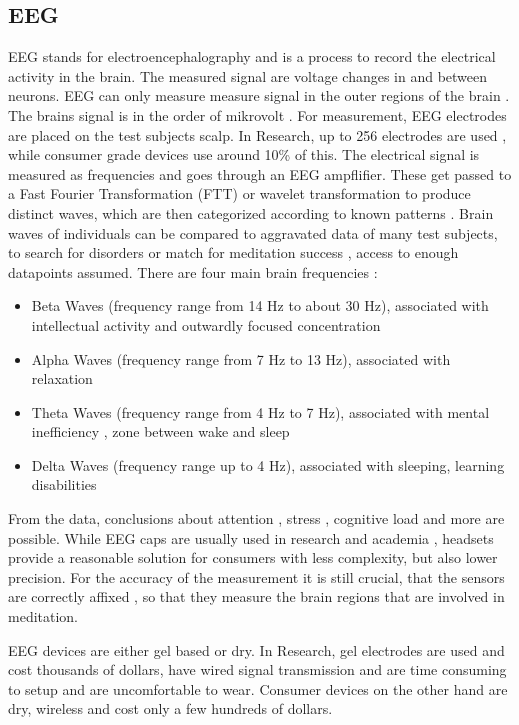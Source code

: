 \documentclass{llncs} %
\begin{document}
\subsection{EEG}
EEG stands for electroencephalography and is a process to record the electrical activity in the brain. The measured signal are voltage changes in and between neurons. EEG can only measure measure signal in the outer regions of the brain \cite{Sitaram}.
The brains signal is in the order of mikrovolt \cite{Berger}.  For measurement, EEG electrodes are placed on the test subjects scalp. In Research, up to 256 electrodes are used \cite{Seeck}, while consumer grade devices use around 10\% of this. \cite{Maskeliunas}
The electrical signal is measured as frequencies and goes through an EEG ampflifier. These get passed to a Fast Fourier Transformation (FTT) or wavelet transformation \cite{Akin} to produce distinct waves, which are then categorized according to known patterns \cite{Shaker}.
Brain waves of individuals can be compared to aggravated data of many test subjects, to search for disorders \cite{Loo} or match for meditation success \cite{Tang:et al}, access to enough datapoints assumed.
There are four main brain frequencies \cite{Cahn}:
\begin{itemize}
    \item 
    Beta Waves (frequency range from 14 Hz to about 30 Hz), associated with intellectual activity and outwardly focused concentration
    \item 
    Alpha Waves (frequency range from 7 Hz to 13 Hz), associated with relaxation
    \item 
    Theta Waves (frequency range from 4 Hz to 7 Hz), associated with mental inefficiency \cite{Hammond}, zone between wake and sleep
    \item 
    Delta Waves (frequency range up to 4 Hz), associated with sleeping, learning disabilities \cite{Hammond}
\end{itemize}
From the data, conclusions about attention \cite{Berka}, stress \cite{Hosseini}, cognitive load \cite{Antonenko} and more are possible.
While EEG caps are usually used in research and academia \cite{Seeck}, headsets provide a reasonable solution for consumers with less complexity, but also lower precision\cite{Maskeliunas}.
For the accuracy of the measurement it is still crucial, that the sensors are correctly affixed \cite{Seeck}, so that they measure the brain regions that are involved in meditation.

EEG devices are either gel based or dry. In Research, gel electrodes are used and cost thousands of dollars, have wired signal transmission and are time consuming to setup and are uncomfortable to wear.
Consumer devices on the other hand are dry, wireless and cost only a few hundreds of dollars. \cite{Decho}
\end{document}
